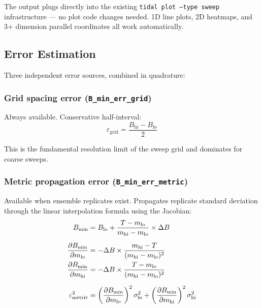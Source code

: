 The output plugs directly into the existing \texttt{tidal plot --type sweep}
infrastructure --- no plot code changes needed. 1D line plots, 2D heatmaps,
and 3+ dimension parallel coordinates all work automatically.

\subsection{Error Estimation}
\label{sec:cf-errors}

Three independent error sources, combined in quadrature:

\subsubsection{Grid spacing error (\texttt{B\_min\_err\_grid})}
\label{sec:err-grid}

Always available. Conservative half-interval:
\begin{equation}
  \varepsilon_\text{grid} = \frac{B_\text{hi} - B_\text{lo}}{2}
  \label{eq:err-grid}
\end{equation}

This is the fundamental resolution limit of the sweep grid and dominates for
coarse sweeps.

\subsubsection{Metric propagation error (\texttt{B\_min\_err\_metric})}
\label{sec:err-metric}

Available when ensemble replicates exist. Propagates replicate standard
deviation through the linear interpolation formula using the Jacobian:
\begin{align}
  B_\text{min} &= B_\text{lo} + \frac{T - m_\text{lo}}{m_\text{hi} - m_\text{lo}} \times \Delta B \label{eq:Bmin-interp} \\[6pt]
  \frac{\partial B_\text{min}}{\partial m_\text{lo}} &= -\Delta B \times \frac{m_\text{hi} - T}{(m_\text{hi} - m_\text{lo})^2} \notag \\
  \frac{\partial B_\text{min}}{\partial m_\text{hi}} &= -\Delta B \times \frac{T - m_\text{lo}}{(m_\text{hi} - m_\text{lo})^2} \notag \\[6pt]
  \varepsilon_\text{metric}^2 &= \left(\frac{\partial B_\text{min}}{\partial m_\text{lo}}\right)^2 \sigma_\text{lo}^2 + \left(\frac{\partial B_\text{min}}{\partial m_\text{hi}}\right)^2 \sigma_\text{hi}^2 \label{eq:err-metric}
\end{align}

